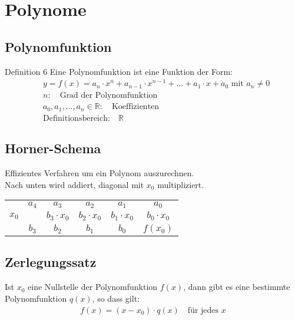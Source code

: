 \section{Polynome}
	\subsection{Polynomfunktion}
	\begin{minipage}{1\linewidth}
		\begin{definition}{Definition 6}
			Eine Polynomfunktion ist eine Funktion der Form:
			\begin{align*}
			&y = f(x) = a_n \cdot x^n + a_{n-1} \cdot x^{n-1} + ... + a_1 
			\cdot x + a_0 \text{ mit } a_n \neq
			0 \\
			&n: \quad \text{Grad der Polynomfunktion} \\ 
			&a_0,a_1,...,a_n \in \mathbb{R}: \quad \text{Koeffizienten} \\
			&\text{Definitionsbereich:} \quad \mathbb{R}
			\end{align*}
		\end{definition}
	\end{minipage}

	\subsection{Horner-Schema}
	\begin{minipage}{1\linewidth}
		Effizientes Verfahren um ein Polynom auszurechnen. \\
		Nach unten wird addiert, diagonal mit $x_0$ multipliziert. \\
		\begin{tabular}{c | c c c c c}
			      & $a_4$ & $a_3$ & $a_2$ & $a_1$ & $a_0$ \\
			$x_0$ &       & $b_3 \cdot x_0$ & $b_2 \cdot x_0$ & $b_1 \cdot x_0$ & $b_0 \cdot x_0$ \\ 
			\hline
			    & $b_3$ & $b_2$ & $b_1$ & $b_0$ & $f(x_0)$
		\end{tabular}
	\end{minipage}

	\subsection{Zerlegungssatz}
	\begin{minipage}{1\linewidth}
		Ist $x_0$ eine Nullstelle der Polynomfunktion $f(x)$, dann gibt es eine bestimmte Polynomfunktion
		$q(x)$, so dass gilt:
		\begin{align*}
			f(x) = (x-x_0) \cdot q(x) \quad \text{für jedes } x	
		\end{align*}
	\end{minipage}

